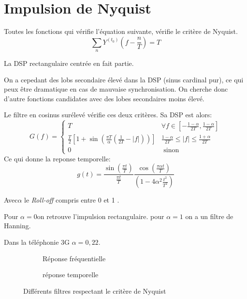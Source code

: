 \documentclass[main.tex]{subfiles}
\begin{document}
\section{Impulsion de Nyquist}

  Toutes les fonctions qui vérifie l'équation suivante, vérifie le critère de Nyquist.
  \[
    \sum_{n}^{}Y^{(t_0)}(f-\frac{n}{T}) = T
  \]

  La DSP rectangulaire centrée en fait partie.
  \begin{rem}
    On a cepedant des lobs secondaire élevé dans la DSP (sinus
    cardinal pur), ce qui peux être dramatique en cas de mauvaise
    synchronisation. On cherche donc d'autre fonctions candidates avec
    des lobes secondaires moins élevé.
  \end{rem}

  \begin{defin}
    Le filtre en cosinus surélevé vérifie ces deux critères. Sa DSP
    est alors:
    \[G(f) = 
      \begin{cases}
        T  & \forall f  \in \left[-\frac{1-\alpha}{2T},\frac{1-\alpha}{2T}\right]\\
        \frac{T}{2}\left[1+\sin\left(\frac{\pi T}{\alpha}\left(\frac{1}{2T}-|f|\right)\right)\right] & \frac{1-\alpha}{2T}\le |f| \le \frac{1+\alpha}{2T}\\
        0 & \text{ sinon}
      \end{cases}
    \]
    Ce qui donne la reponse temporelle:
    \[
      g(t) = \frac{\sin\left(\frac{\pi t}{T}\right)}{\frac{\pi t}{T}}
      \frac{\cos\left(\frac{\pi\alpha t}{T}\right)}{\left(1-4\alpha^2 \frac{t^2}{T^2}\right)}
    \]

    Avec$\alpha$ le \emph{Roll-off} compris entre 0 et 1 .

    Pour $\alpha=0$on retrouve l'impulsion rectangulaire. pour $\alpha=1$ on a
    un filtre de Hanning.
  \end{defin}
  \begin{exemple}
    Dans la téléphonie 3G $\alpha=0,22$.
  \end{exemple}

  \begin{figure}[H]
    \centering
    \begin{subfigure}{0.5\textwidth}
          
      \caption{Réponse fréquentielle}
     
    \end{subfigure}%
    \begin{subfigure}{0.5\textwidth}
      \centering
      \caption{réponse temporelle}
     
    \end{subfigure}
    \caption{Différents filtres respectant le critère de Nyquist}
  \end{figure}
 
\end{document}
